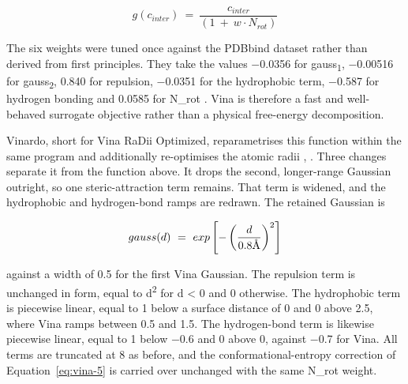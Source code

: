 \begin{equation}
g\left( c_{inter} \right)\  = \ \frac{c_{inter}}{\left( 1\  + \ w \cdot N_{rot} \right)}
\label{eq:vina-5}
\end{equation}

The six weights were tuned once against the PDBbind dataset rather than derived from first principles. They take the values \ensuremath{-}0.0356 for gauss\textsubscript{1}, \ensuremath{-}0.00516 for gauss\textsubscript{2}, 0.840 for repulsion, \ensuremath{-}0.0351 for the hydrophobic term, \ensuremath{-}0.587 for hydrogen bonding and 0.0585 for N\_rot \cite{ref022}. Vina is therefore a fast and well-behaved surrogate objective rather than a physical free-energy decomposition.

Vinardo, short for Vina RaDii Optimized, reparametrises this function within the same program and additionally re-optimises the atomic radii \cite{ref023}, \cite{ref073}. Three changes separate it from the function above. It drops the second, longer-range Gaussian outright, so one steric-attraction term remains. That term is widened, and the hydrophobic and hydrogen-bond ramps are redrawn. The retained Gaussian is

\begin{equation}
{gauss}(d)\  = \ exp\left\lbrack - \left( \frac{d}{0.8\text{\AA}{}} \right)^{2} \right\rbrack
\label{eq:vinardo-1}
\end{equation}

against a width of 0.5\angstrom{} for the first Vina Gaussian. The repulsion term is unchanged in form, equal to d\textsuperscript{2} for d \textless{} 0 and 0 otherwise. The hydrophobic term is piecewise linear, equal to 1 below a surface distance of 0\angstrom{} and 0 above 2.5\angstrom{}, where Vina ramps between 0.5 and 1.5\angstrom{}. The hydrogen-bond term is likewise piecewise linear, equal to 1 below \ensuremath{-}0.6\angstrom{} and 0 above 0, against \ensuremath{-}0.7\angstrom{} for Vina. All terms are truncated at 8\angstrom{} as before, and the conformational-entropy correction of Equation~\ref{eq:vina-5} is carried over unchanged with the same N\_rot weight.

